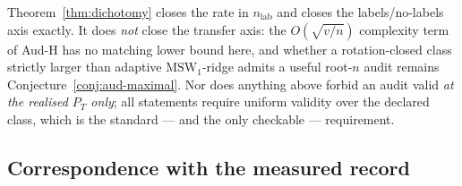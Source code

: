 \begin{remark}\label{rem:notsharp}
Theorem~\ref{thm:dichotomy} closes the rate in $n_{\mathrm{lab}}$ and closes the
labels/no-labels axis exactly. It does \emph{not} close the transfer axis: the
$O(\sqrt{v/n})$ complexity term of Aud-H has no matching lower bound here, and whether a
rotation-closed class strictly larger than adaptive $\mathrm{MSW}_1$-ridge admits a useful
root-$n$ audit remains Conjecture~\ref{conj:aud-maximal}. Nor does anything above forbid an
audit valid \emph{at the realised $P_T$ only}; all statements require uniform validity over
the declared class, which is the standard --- and the only checkable --- requirement.
\end{remark}

\subsection{Correspondence with the measured record}

